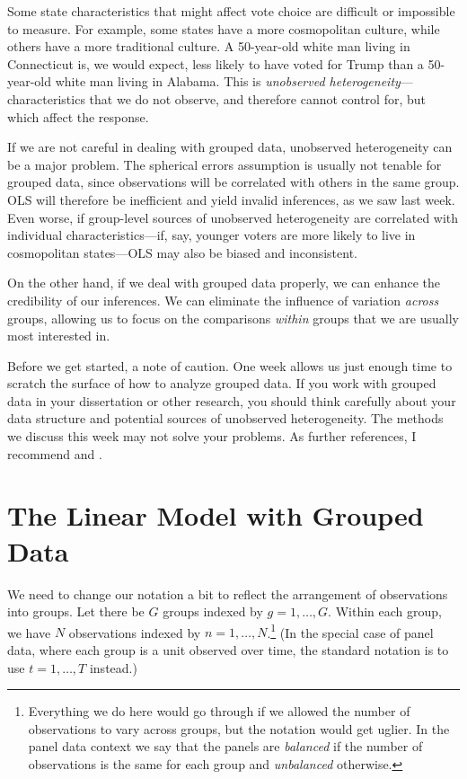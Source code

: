 \documentclass[12pt,oneside,openany]{book}
\begin{document}
Some state characteristics that might affect vote choice are difficult
or impossible to measure. For example, some states have a more
cosmopolitan culture, while others have a more traditional culture. A
50-year-old white man living in Connecticut is, we would expect, less
likely to have voted for Trump than a 50-year-old white man living in
Alabama. This is \emph{unobserved heterogeneity}---characteristics that
we do not observe, and therefore cannot control for, but which affect
the response.

If we are not careful in dealing with grouped data, unobserved
heterogeneity can be a major problem. The spherical errors assumption is
usually not tenable for grouped data, since observations will be
correlated with others in the same group. OLS will therefore be
inefficient and yield invalid inferences, as we saw last week. Even
worse, if group-level sources of unobserved heterogeneity are correlated
with individual characteristics---if, say, younger voters are more
likely to live in cosmopolitan states---OLS may also be biased and
inconsistent.

On the other hand, if we deal with grouped data properly, we can enhance
the credibility of our inferences. We can eliminate the influence of
variation \emph{across} groups, allowing us to focus on the comparisons
\emph{within} groups that we are usually most interested in.

Before we get started, a note of caution. One week allows us just enough
time to scratch the surface of how to analyze grouped data. If you work
with grouped data in your dissertation or other research, you should
think carefully about your data structure and potential sources of
unobserved heterogeneity. The methods we discuss this week may not solve
your problems. As further references, I recommend
\citet{Wooldridge:2002vr} and \citet{gelman2006data}.

\section{The Linear Model with Grouped
Data}\label{the-linear-model-with-grouped-data}

We need to change our notation a bit to reflect the arrangement of
observations into groups. Let there be \(G\) groups indexed by
\(g = 1, \ldots, G\). Within each group, we have \(N\) observations
indexed by \(n = 1, \ldots, N\).\footnote{Everything we do here would go
  through if we allowed the number of observations to vary across
  groups, but the notation would get uglier. In the panel data context
  we say that the panels are \emph{balanced} if the number of
  observations is the same for each group and \emph{unbalanced}
  otherwise.} (In the special case of panel data, where each group is a
unit observed over time, the standard notation is to use
\(t = 1, \ldots, T\) instead.)
\end{document}
